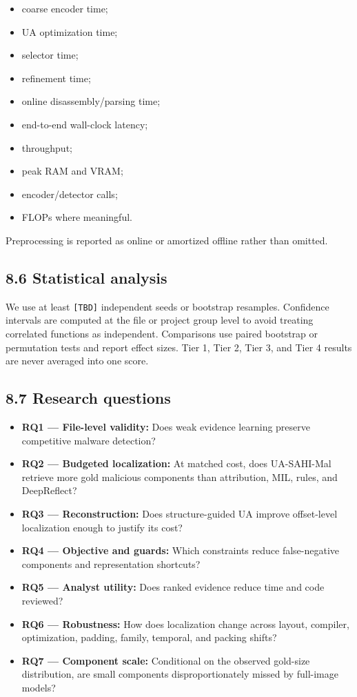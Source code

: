 \documentclass[
  10pt,
]{article}
\providecommand{\tightlist}{%
  \setlength{\itemsep}{0pt}\setlength{\parskip}{0pt}}
\begin{document}
\begin{itemize}
\tightlist
\item
  coarse encoder time;
\item
  UA optimization time;
\item
  selector time;
\item
  refinement time;
\item
  online disassembly/parsing time;
\item
  end-to-end wall-clock latency;
\item
  throughput;
\item
  peak RAM and VRAM;
\item
  encoder/detector calls;
\item
  FLOPs where meaningful.
\end{itemize}

Preprocessing is reported as online or amortized offline rather than
omitted.

\subsection{8.6 Statistical analysis}\label{statistical-analysis}

We use at least \texttt{{[}TBD{]}} independent seeds or bootstrap
resamples. Confidence intervals are computed at the file or project
group level to avoid treating correlated functions as independent.
Comparisons use paired bootstrap or permutation tests and report effect
sizes. Tier 1, Tier 2, Tier 3, and Tier 4 results are never averaged
into one score.

\subsection{8.7 Research questions}\label{research-questions}

\begin{itemize}
\tightlist
\item
  \textbf{RQ1 --- File-level validity:} Does weak evidence learning
  preserve competitive malware detection?
\item
  \textbf{RQ2 --- Budgeted localization:} At matched cost, does
  UA-SAHI-Mal retrieve more gold malicious components than attribution,
  MIL, rules, and DeepReflect?
\item
  \textbf{RQ3 --- Reconstruction:} Does structure-guided UA improve
  offset-level localization enough to justify its cost?
\item
  \textbf{RQ4 --- Objective and guards:} Which constraints reduce
  false-negative components and representation shortcuts?
\item
  \textbf{RQ5 --- Analyst utility:} Does ranked evidence reduce time and
  code reviewed?
\item
  \textbf{RQ6 --- Robustness:} How does localization change across
  layout, compiler, optimization, padding, family, temporal, and packing
  shifts?
\item
  \textbf{RQ7 --- Component scale:} Conditional on the observed
  gold-size distribution, are small components disproportionately missed
  by full-image models?
\end{itemize}
\end{document}
